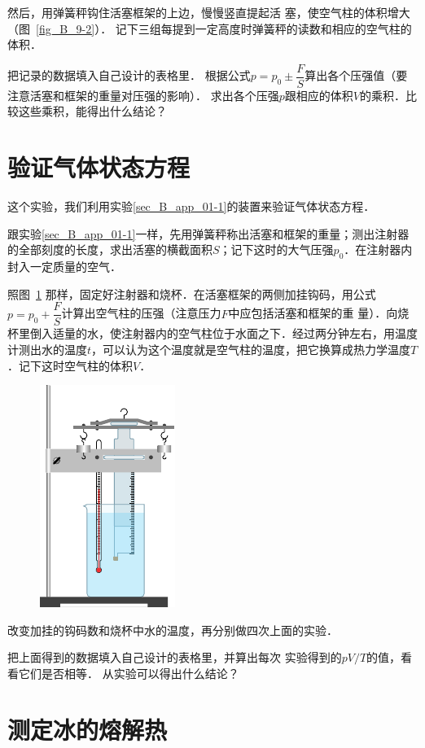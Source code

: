 然后，用弹簧秤钩住活塞框架的上边，慢慢竖直提起活
塞，使空气柱的体积增大（图~\ref{fig_B_9-2}）．
记下三组每提到一定高度时弹簧秤的读数和相应的空气柱的体积．

把记录的数据填入自己设计的表格里．
根据公式$p=p_0\pm \dfrac{F}{S}$算出各个压强值（要注意活塞和框架的重量对压强的影响）．
求出各个压强$p$跟相应的体积$V$的乘积．比较这些乘积，能得出什么结论？

\section{验证气体状态方程}
这个实验，我们利用实验\ref{sec_B_app_01-1}的装置来验证气体状态方程．

跟实验\ref{sec_B_app_01-1}一样，先用弹簧秤称出活塞和框架的重量；测出注射器的全部刻度的长度，求出活塞的横截面积$S$；记下这时的大气压强$p_0$．在注射器内封入一定质量的空气．


照图~\ref{fig_B_9-3} 那样，固定好注射器和烧杯．在活塞框架的两侧加挂钩码，用公式$p=p_0+ \dfrac{F}{S}$计算出空气柱的压强（注意压力$F$中应包括活塞和框架的重
量）．向烧杯里倒入适量的水，使注射器内的空气柱位于水面之下．经过两分钟左右，用温度计测出水的温度$t$，可以认为这个温度就是空气柱的温度，把它换算成热力学温度$T$．记下这时空气柱的体积$V$．

\begin{figure}[htbp]
	\centering
	\includegraphics{fig/B/9-3.pdf}
	\caption{}\label{fig_B_9-3}
\end{figure}


改变加挂的钩码数和烧杯中水的温度，再分别做四次上面的实验．

把上面得到的数据填入自己设计的表格里，并算出每次
实验得到的$pV/T$的值，看看它们是否相等．
从实验可以得出什么结论？

\section{测定冰的熔解热}

